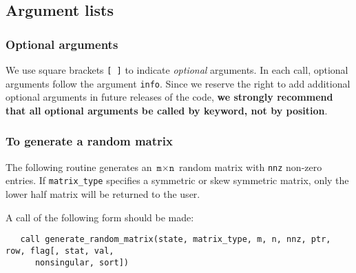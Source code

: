 \documentclass{spral}
\begin{document}

\subsection{Argument lists}

\subsubsection{Optional arguments}\label{Optional arguments}

We use square brackets {\tt [ ]} to indicate {\it optional} arguments.
In each
call, optional arguments follow the argument {\tt info}.  Since we
reserve the right to add additional optional arguments in future
releases of the code, {\bf we strongly recommend that all optional
arguments be called by keyword, not by position}.


\subsubsection{To generate a random matrix}

The following routine generates an $\texttt{m}\times \texttt{n}$ random matrix
with \texttt{nnz} non-zero entries. If \texttt{matrix\_type} specifies a
symmetric or skew symmetric matrix, only the lower half matrix will be returned
to the user.

\noindent
A call of the following form should be made:
\begin{verbatim}
   call generate_random_matrix(state, matrix_type, m, n, nnz, ptr, row, flag[, stat, val,
      nonsingular, sort])
\end{verbatim}
\end{document}
